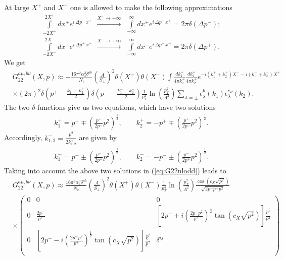 \documentclass[onecolumn,showpacs,nobibnotes,nofootinbib,12pt,aps,prd,showpacs,notitlepage,nofootinbib,preprintnumbers,amsmath,amssymb]{article}
\begin{document}
At large $X^+$ and $X^-$ one is allowed to make the following approximations
\begin{subequations}\label{late_time}
\begin{align}
  \int\limits_{-2 X^+}^{2 X^+} d x^+ e^{i \, \Delta p^- \, x^+ } \ \
  \overset{X^+ \to + \infty}{\longrightarrow} \ \
  \int\limits_{-\infty}^{\infty} d x^+ e^{i \, \Delta p^- \, x^+ } =
  2\pi\delta(\Delta p^-); \\
  \int\limits_{-2 X^-}^{2 X^-} d x^- e^{i \, \Delta p^+ \, x^- } \ \
  \overset{X^- \to + \infty}{\longrightarrow} \ \
  \int\limits_{-\infty}^{\infty} d x^- e^{i \, \Delta p^+ \, x^- } =
  2\pi\delta(\Delta p^+).
\end{align}
\end{subequations}
We get
\begin{align}
  & G_{22}^{a\mu,b\nu}(X, p)\approx-\frac{16\pi^2\alpha_s^3\delta^{ab}}{N_c}\left(\frac{A}{S_\perp}\right)^2 \theta(X^+) \theta(X^-) \int \frac{dk_1^+}{4\pi k_1^+}  \frac{dk_2^+}{4\pi k_2^+} e^{-i (k_1^+ + k_2^+) X^- -i (k_1^- + k_2^-) X^+}\nonumber\\
  & \times (2\pi)^2\delta \! \left(p^+-\frac{k_1^+-k_2^+}{2}\right)
  \delta \! \left(p^--\frac{k_1^- - k_2^-}{2}\right) \frac{1}{p_T^4}
  \ln\left(\frac{p_T^2}{\Lambda^2}\right)
  \sum\limits_{\lambda=\pm}\epsilon_\lambda^\mu(k_1)
  \epsilon_{\lambda}^{*\nu}(k_2).
  \label{eq:G22nlodd}
\end{align}
The two $\delta$-functions give us two equations, which have two
solutions
\begin{align}\label{eq:kp}
k_1^+=p^+\mp \left( \frac{p^+}{2p^-} p^2\right)^{\frac{1}{2}},\qquad k_2^+=-p^+\mp \left( \frac{p^+}{2p^-} p^2\right)^{\frac{1}{2}}.
\end{align}
Accordingly, $k_{1,2}^-=\frac{\underline{p}^2}{2 k_{1,2}^+}$ are given by
\begin{align}\label{eq:km}
k_1^-=p^-\pm \left( \frac{p^-}{2p^+} p^2\right)^{\frac{1}{2}},\qquad k_2^-=-p^-\pm \left( \frac{p^-}{2p^+} p^2\right)^{\frac{1}{2}}.
\end{align}
Taking into account the above two solutions in (\ref{eq:G22nlodd})
leads to
\begin{align}\label{eq:G22LOquas}
  &G_{22}^{a\mu,b\nu}(X,
  p)\approx\frac{16\pi^2\alpha_s^3\delta^{ab}}{N_c}\left(\frac{A}{S_\perp}\right)^2\theta(X^+)
  \theta(X^-) \frac{1}{p_T^4}\ln\left(\frac{p_T^2}{\Lambda^2}\right)
  \frac{\cos  \left(c_X \sqrt{p^2}\right)}{\sqrt{2 p^- p^+ p^2}} \\
  &\times \left(
\begin{array}{ccc}
  0&0&0\\
  0& \frac{2 p^-}{p^+} &\left[ 2 p^- + i \left(\frac{2 p^-p^2}{p^+}\right)^{\frac{1}{2}} \tan  \left(c_X \sqrt{p^2}\right)\right]\frac{\underline{p}^i}{\underline{p}^2} \\
  0&\left[ 2 p^- -i \left(\frac{2 p^-p^2}{p^+}\right)^{\frac{1}{2}} \tan  \left(c_X \sqrt{p^2}\right)\right]\frac{\underline{p}^i}{\underline{p}^2} & \delta^{ij}  \\
\end{array}
\right) \nonumber
\end{align}
\end{document}
